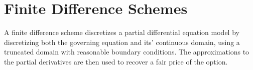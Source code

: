 \documentclass[12pt]{report}
\begin{document}






\section{Finite Difference Schemes}
A finite difference scheme discretizes a partial differential equation model by discretizing both the governing equation and its' continuous domain, using a truncated domain with reasonable boundary conditions. The approximations to the partial derivatives are then used to recover a fair price of the option.
\end{document}
